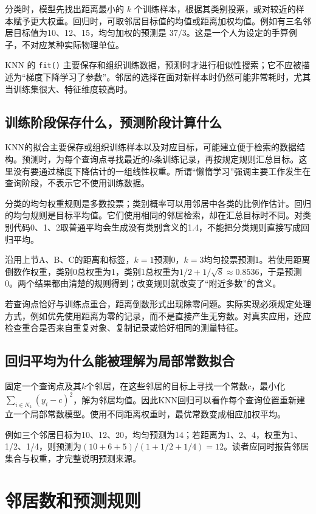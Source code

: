 分类时，模型先找出距离最小的 $k$ 个训练样本，根据其类别投票，或对较近的样本赋予更大权重。回归时，可取邻居目标值的均值或距离加权均值。例如有三名邻居目标值为10、12、15，均匀加权的预测是 $37/3$。这是一个人为设定的手算例子，不对应某种实际物理单位。

KNN 的 \texttt{fit()} 主要保存和组织训练数据，预测时才进行相似性搜索；它不应被描述为“梯度下降学习了参数”。邻居的选择在面对新样本时仍然可能非常耗时，尤其当训练集很大、特征维度较高时。

\subsection{训练阶段保存什么，预测阶段计算什么}
KNN的拟合主要保存或组织训练样本以及对应目标，可能建立便于检索的数据结构。预测时，为每个查询点寻找最近的$k$条训练记录，再按规定规则汇总目标。这里没有要通过梯度下降估计的一组线性权重。所谓“懒惰学习”强调主要工作发生在查询阶段，不表示它不使用训练数据。

分类的均匀权重规则是多数投票；类别概率可以用邻居中各类的比例作估计。回归的均匀规则是目标平均值。它们使用相同的邻居检索，却在汇总目标时不同。对类别代码0、1、2取普通平均会生成没有类别含义的1.4，不能把分类规则直接写成回归平均。

沿用上节A、B、C的距离和标签，$k=1$预测0，$k=3$均匀投票预测1。若使用距离倒数作权重，类别0总权重为1，类别1总权重为$1/2+1/\sqrt8\approx0.8536$，于是预测0。两个结果都由清楚的规则得到；改变规则就改变了“附近多数”的含义。

若查询点恰好与训练点重合，距离倒数形式出现除零问题。实际实现必须规定处理方式，例如优先使用距离为零的记录，而不是直接产生无穷数。对真实应用，还应检查重合是否来自重复对象、复制记录或恰好相同的测量特征。

\subsection{回归平均为什么能被理解为局部常数拟合}
固定一个查询点及其$k$个邻居，在这些邻居的目标上寻找一个常数$c$，最小化$\sum_{i\in N_k}(y_i-c)^2$，解为邻居均值。因此KNN回归可以看作每个查询位置重新建立一个局部常数模型。使用不同距离权重时，最优常数变成相应加权平均。

例如三个邻居目标为10、12、20，均匀预测为14；若距离为1、2、4，权重为1、1/2、1/4，则预测为$(10+6+5)/(1+1/2+1/4)=12$。读者应同时报告邻居集合与权重，才完整说明预测来源。

\section{邻居数和预测规则}

